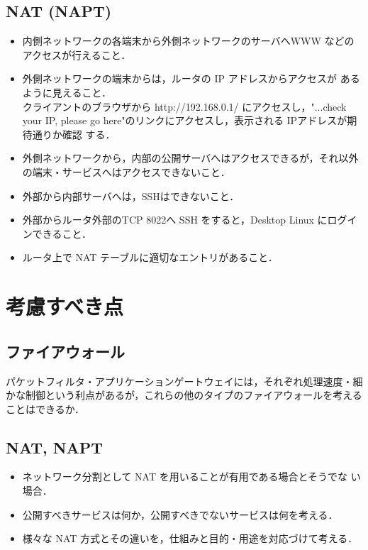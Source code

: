 \subsection*{NAT (NAPT)}

\begin{itemize}
 \item 内側ネットワークの各端末から外側ネットワークのサーバへWWW
       などのアクセスが行えること．
 \item 外側ネットワークの端末からは，ルータの IP アドレスからアクセスが
       あるように見えること．\\ クライアントのブラウザから 
       http://192.168.0.1/ にアクセスし，"...check your IP, please go
       here"のリンクにアクセスし，表示される IPアドレスが期待通りか確認
       する．
 \item 外側ネットワークから，内部の公開サーバへはアクセスできるが，それ以外の端末・サービスへはアクセスできないこと．
 \item 外部から内部サーバへは，SSHはできないこと．
 \item 外部からルータ外部のTCP 8022へ SSH をすると，Desktop Linux にログインできること．
 \item ルータ上で NAT テーブルに適切なエントリがあること．
\end{itemize}




\section{考慮すべき点}

\subsection*{ファイアウォール}

パケットフィルタ・アプリケーションゲートウェイには，それぞれ処理速度・細
かな制御という利点があるが，これらの他のタイプのファイアウォールを考える
ことはできるか．

\subsection*{NAT, NAPT}

\begin{itemize}
 \item ネットワーク分割として NAT を用いることが有用である場合とそうでな
       い場合．
 \item 公開すべきサービスは何か，公開すべきでないサービスは何を考える．
 \item 様々な NAT 方式とその違いを，仕組みと目的・用途を対応づけて考える．
\end{itemize}


